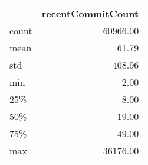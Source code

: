 \begin{tabular}{lr}
 & \textbf{recentCommitCount} \\
count & 60966.00 \\
mean & 61.79 \\
std & 408.96 \\
min & 2.00 \\
25\% & 8.00 \\
50\% & 19.00 \\
75\% & 49.00 \\
max & 36176.00 \\
\end{tabular}
